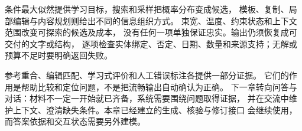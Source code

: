 条件最大似然提供学习目标，搜索和采样把概率分布变成候选，
模板、复制、局部编辑与内容规划则给出不同的信息组织方式。
束宽、温度、约束状态和上下文范围改变可探索的候选及成本，
没有任何一项单独保证忠实。输出仍须恢复成可交付的文字或结构，
逐项检查实体绑定、否定、日期、数量和来源支持；无解或预算不足时要明确返回失败。

参考重合、编辑匹配、学习式评价和人工错误标注各提供一部分证据。
它们的作用是帮助比较和定位问题，不是把流畅输出自动确认为正确。
下一章转向问答与对话：材料不一定一开始就已齐备，系统需要围绕问题取得证据，
并在交流中维护上下文、澄清缺失条件。本章已经建立的生成、核验与修订接口
会继续使用，而答案依据和交互状态需要另外建模。

